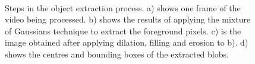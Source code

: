 \documentclass[conference]{IEEEtran}
\begin{document}
\begin{figure}
  \centering
    \\
  \caption{Steps in the object extraction process. a) shows one frame of the
  video being processed. b) shows the results of applying the mixture of
  Gaussians technique to extract the foreground pixels. c) is the image obtained
after applying dilation, filling and erosion to b). d) shows the centres and
bounding boxes of the extracted blobs.}
  \label{fig:fgextract}
\end{figure}
\end{document}
